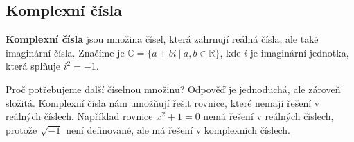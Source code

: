 \subsection{Komplexní čísla}
\begin{definitionbox}
  \textbf{Komplexní čísla} jsou množina čísel, která zahrnují reálná čísla, ale také imaginární čísla. Značíme je $\mathbb{C} = \{a + bi\ |\ a, b\in\mathbb{R}\}$, kde $i$ je imaginární jednotka, která splňuje $i^2 = -1$.
\end{definitionbox}

Proč potřebujeme další číselnou množinu? Odpověď je jednoduchá, ale zároveň složitá. Komplexní čísla nám umožňují řešit rovnice, které nemají řešení v reálných číslech. Například rovnice $x^2 + 1 = 0$ nemá řešení v reálných číslech, protože $\sqrt{-1}$ není definované, ale má řešení v komplexních číslech.